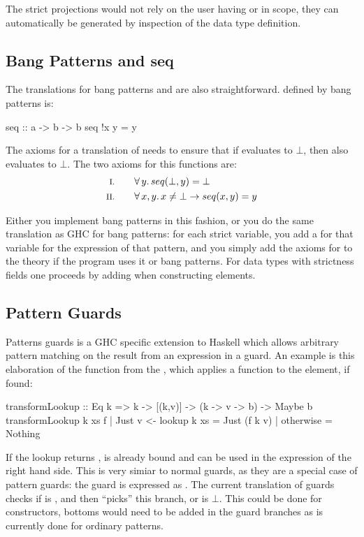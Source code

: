 The strict projections would not rely on the user having  or
 in scope, they can automatically be generated by
inspection of the data type definition.

\subsection{Bang Patterns and seq}

The translations for bang patterns and  are also
straightforward.  defined by bang patterns is:

\begin{code}
seq :: a -> b -> b
seq !x y = y
\end{code}

The axioms for a translation of  needs to ensure that if
 evaluates to $\bot$, then  also evaluates to
$\bot$. The two axioms for this functions are:
\begin{align*}
\rom{1} \qquad & \fa{y}    seq(\bot,y) \eq \bot \\
\rom{2} \qquad & \faa{x}{y} x \neq \bot \rightarrow seq(x,y) \eq y
\end{align*}

Either you implement bang patterns in this fashion, or you do the same
translation as GHC for bang patterns: for each strict variable, you
add a  for that variable for the expression of that pattern,
and you simply add the axioms for  to the theory if the
program uses it or bang patterns. For data types with strictness
fields one proceeds by adding  when constructing elements.

\subsection{Pattern Guards}

Patterns guards is a GHC specific extension to Haskell which allows
arbitrary pattern matching on the result from an expression in a
guard. An example is this elaboration of the  function from
the , which applies a function to the element, if found:

\begin{code}
transformLookup :: Eq k => k -> [(k,v)] -> (k -> v -> b) -> Maybe b
transformLookup k xs f | Just v <- lookup k xs = Just (f k v)
                       | otherwise             = Nothing
\end{code}

\noindent
If the lookup returns ,  is already bound and can be
used in the expression of the right hand side. This is very simiar to
normal guards, as they are a special case of pattern guards: the guard
 is expressed as . The current
translation of guards checks if  is , and then
``picks'' this branch, or is $\bot$. This could be done for
constructors, bottoms would need to be added in the guard branches as
is currently done for ordinary patterns.

